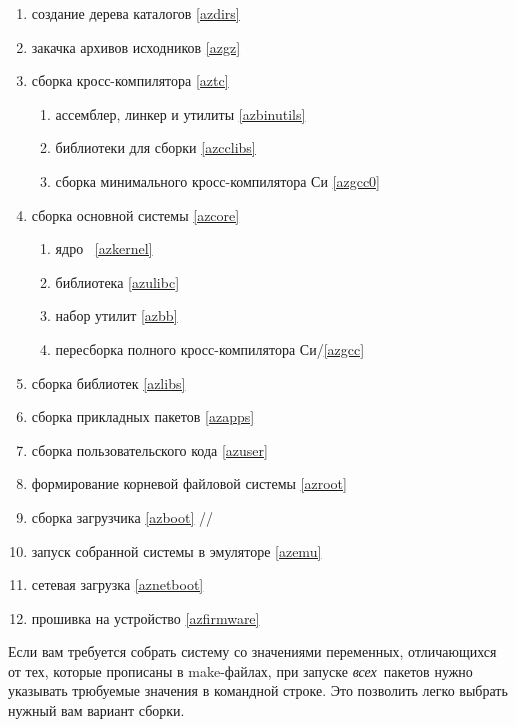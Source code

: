 \begin{enumerate}
  \item {} создание дерева каталогов \ref{azdirs}
  \item {} закачка архивов исходников \ref{azgz}
  \item {} сборка кросс-компилятора \ref{aztc}
  \begin{enumerate}
    \item {} ассемблер, линкер и утилиты \ref{azbinutils}
    \item {} библиотеки для сборки  \ref{azcclibs}
    \item {} сборка минимального кросс-компилятора Си \ref{azgcc0}
  \end{enumerate}
  \item {} сборка основной системы \ref{azcore}
  \begin{enumerate}
    \item {} ядро \linux\ \ref{azkernel}
    \item {} библиотека  \ref{azulibc}
    \item {} набор утилит  \ref{azbb}
    \item {} пересборка полного кросс-компилятора Си/\cpp \ref{azgcc}
  \end{enumerate}
  \item {} сборка библиотек  \ref{azlibs}
  \item {} сборка прикладных пакетов  \ref{azapps}
  \item {} сборка пользовательского кода \ref{azuser}
  \item {} формирование корневой файловой системы \ref{azroot}
  \item {} сборка загрузчика \ref{azboot}
   //
  \item {} запуск собранной системы в эмуляторе \ref{azemu}
  \item {} сетевая загрузка \ref{aznetboot}
  \item {} прошивка на устройство \ref{azfirmware}
\end{enumerate}


Если вам требуется собрать систему со значениями переменных, отличающихся от
тех, которые прописаны в make-файлах, при запуске \emph{всех}\ пакетов нужно
указывать трюбуемые значения в командной строке. Это позволить легко выбрать
нужный вам вариант сборки.

